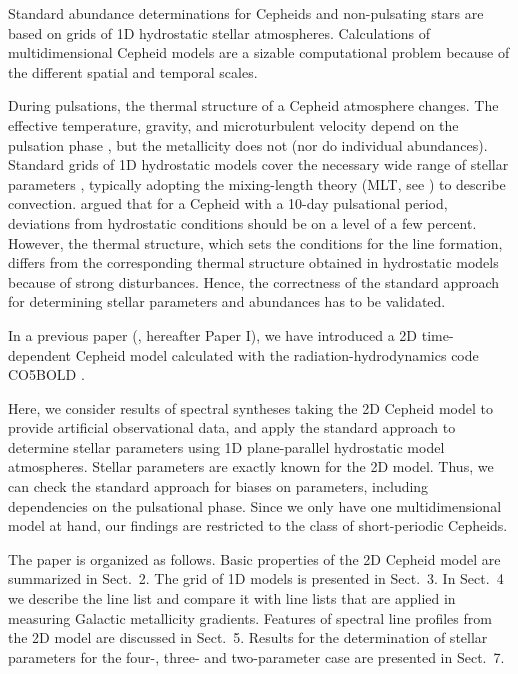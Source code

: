 \documentclass{aa}
\begin{document}
Standard abundance determinations for Cepheids and non-pulsating stars
are based on grids of 1D hydrostatic stellar atmospheres. Calculations of
multidimensional Cepheid models are a sizable computational problem because of the different spatial and temporal scales.

During pulsations, the thermal structure of a Cepheid atmosphere changes.  The
effective temperature, gravity, and microturbulent velocity depend on the pulsation phase \citep{2002A&A...381...32A,2002A&A...392..491A,
2003A&A...401..939L,2004A&A...413..159A}, but the
metallicity does not (nor do individual abundances).  Standard grids of 1D
hydrostatic models cover the necessary wide range of stellar parameters
\citep{1992IAUS..149..225K, 2008A&A...486..951G}, typically adopting  
the mixing-length theory (MLT, see \citealt{1958ZA.....46..108B}) to describe convection.
\cite{1987VA.....30..197G} argued that for a Cepheid with a 10-day pulsational
period, deviations from hydrostatic conditions should be on a level of a few
percent. However, the thermal structure, which sets the conditions for the
line formation, differs from the corresponding thermal structure obtained in
hydrostatic models because of strong disturbances. Hence, the correctness of the
standard approach for determining stellar parameters and abundances
has to be validated.

In a previous paper (\citealt{2017arXiv170903905V}, hereafter Paper I), we have
introduced a 2D time-dependent Cepheid model calculated with the 
radiation-hydrodynamics code CO5BOLD \citep{2012JCoPh.231..919F}.

Here, we consider results of spectral syntheses taking the 2D
Cepheid model to provide artificial observational data, and apply the
standard approach to determine stellar parameters using 1D plane-parallel
hydrostatic model atmospheres.  Stellar parameters are exactly known for the
2D model. Thus, we can check the standard approach for biases on
parameters, including dependencies on the pulsational phase.  Since we only have
one multidimensional model at hand, our findings are restricted to the class
of short-periodic Cepheids.

The paper is organized as follows. Basic properties of the 2D 
Cepheid model are summarized in Sect.~2. The grid of 1D models is presented in
Sect.~3.  In Sect.~4 we describe the line list and compare it with line lists
that are applied in measuring Galactic metallicity
gradients. Features of spectral line profiles from the 2D model are discussed
in Sect.~5. Results for the determination of stellar parameters for the four-,
three- and two-parameter case are presented in Sect.~7.
\end{document}

